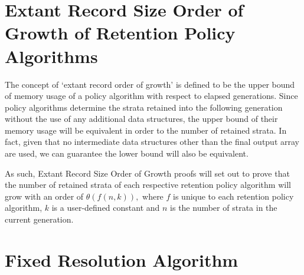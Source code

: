 \printunsrtglossary[numberedsection=autolabel]

\section{Extant Record Size Order of Growth of Retention Policy Algorithms} \label{sec:extant_record_oog}
The concept of `extant record order of growth' is defined to be the upper bound of memory usage of a policy algorithm with respect to elapsed generations.
Since policy algorithms determine the strata retained into the following generation without the use of any additional data structures, the upper bound of their memory usage will be equivalent in order to the number of retained strata.
In fact, given that no intermediate data structures other than the final output array are used, we can guarantee the lower bound will also be equivalent.

As such, Extant Record Size Order of Growth proofs will set out to prove that the number of retained strata of each respective retention policy algorithm will grow with an order of $\mathcal{\theta}(f(n, k)),$ where $f$ is unique to each retention policy algorithm, $k$ is a user-defined constant and $n$ is the number of strata in the current generation.

\section{Fixed Resolution Algorithm}



